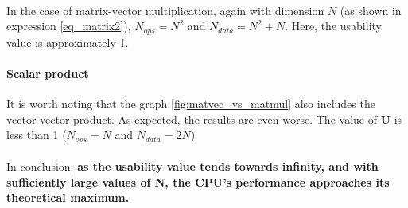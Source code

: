 \paragraph*{} In the case of matrix-vector multiplication, again with dimension $N$ (as shown in expression \ref{eq_matrix2}),
$N_{ops} = N^2$ and $N_{data} = N^2 + N$. Here, the usability value is approximately 1.

\paragraph*{Scalar product} It is worth noting that the graph \ref{fig:matvec_vs_matmul} also includes the vector-vector product.
As expected, the results are even worse. The value of \textbf{U} is less than 1 ($N_{ops} = N$ and $N_{data} = 2N$)

\paragraph*{} In conclusion, \textbf{as the usability value tends towards infinity, and with sufficiently large values of N, the CPU's 
performance approaches its theoretical maximum.}

\clearpage
\newpage